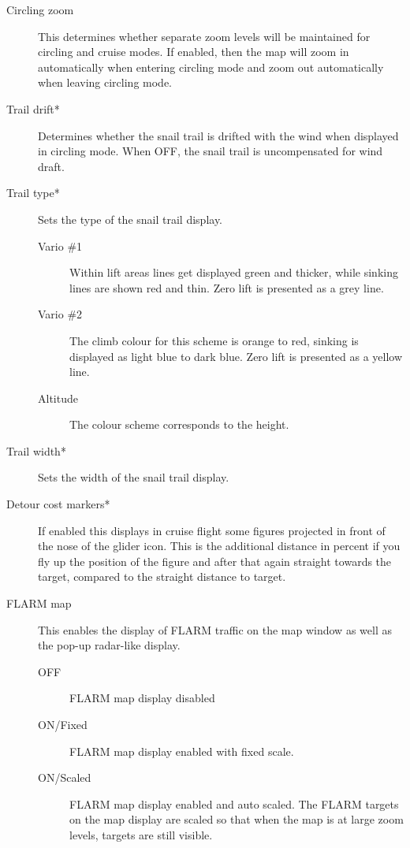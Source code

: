 \documentclass[a4paper,12pt]{refrep}
\begin{document}
\begin{description}
\item[Circling zoom] \label{conf:circlingzoom} This determines whether separate
zoom levels will be maintained for circling and cruise modes.  If enabled, then the 
map will zoom in automatically when entering circling mode and zoom out
automatically when leaving circling mode.

\item[Trail drift*] \label{conf:traildrift} Determines whether the
snail trail is drifted with the wind when displayed in circling mode.  When OFF,
the snail trail is uncompensated for wind draft.

\item[Trail type*] \label{conf:snailtype} Sets the type of the snail trail
display.
\begin{description}
\item[Vario \#1]  Within lift areas lines get displayed green and
thicker, while sinking lines are shown red and thin.  Zero lift
is presented as a grey line.
\item[Vario \#2]  The climb colour for this scheme is orange to red, sinking is
displayed as light blue to dark blue. Zero lift
is presented as a yellow line.
\item[Altitude] The colour scheme corresponds to the height.
\end{description}

\item[Trail width*] \label{conf:trailwidth} Sets the width of the snail trail
display.
\item[Detour cost markers*]  If enabled this displays in cruise flight some
figures projected in front of the nose of the glider icon.  This is the
additional distance in percent if you fly up the position of the figure and
after that again straight towards the target, compared to the straight distance
to target.
\item[FLARM map]  \label{conf:flarm-on-map}This enables the display of FLARM
traffic on the map window as well as the pop-up radar-like display.
\begin{description}
\item[OFF]  FLARM map display disabled
\item[ON/Fixed]  FLARM map display enabled with fixed scale.
\item[ON/Scaled]  FLARM map display enabled and auto scaled. The FLARM targets on the map display are 
scaled so that when the map is at large zoom levels, targets are still visible.
\end{description}
\end{description}
\end{document}
